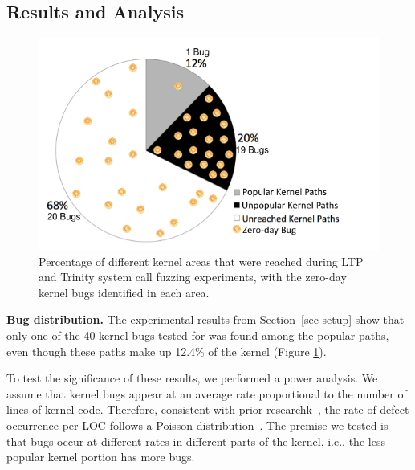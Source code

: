 \subsection{Results and Analysis}
\label{Verification-of-Hypothesis}
\begin{figure}
\centering
\includegraphics[width=1.0\columnwidth]{diagram/popular_paths.png}
\caption{\small Percentage of different kernel areas that were reached during
 LTP and Trinity system call fuzzing experiments, with the zero-day kernel bugs identified
 in each area.}
\label{fig:coverage}
\end{figure}

{\bf Bug distribution.}
The experimental results from Section~\ref{sec-setup} show that only one of the 40 kernel bugs
tested for was found among the popular paths, even though these paths make up 12.4\% of the kernel
(Figure \ref{fig:coverage}).

To test the significance of these results, we performed a power analysis.
%
We assume that kernel bugs appear at an average rate proportional to the
number of lines of kernel code.
Therefore, consistent with prior researchk~\cite{mayer1989probability}, the 
rate of defect occurrence per LOC follows a Poisson 
distribution~\cite{Poisson-distribution}.
The premise we tested is that bugs occur at different rates in different
parts of the kernel, i.e., the less popular kernel portion has more bugs.

